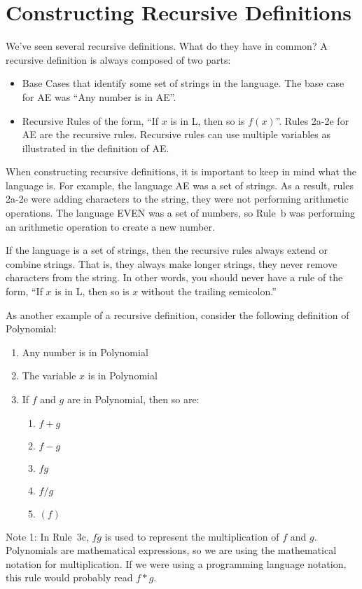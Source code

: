 \documentclass[letterpaper,12pt,openany,reqno]{book}%
\begin{document}
\section{Constructing Recursive Definitions}
We've seen several recursive definitions. What do they have in common? A recursive definition is always composed of two parts:
\begin{itemize}
\item Base Cases that identify some set of strings in the language. The base case for AE was ``Any number is in AE''.
\item Recursive Rules of the form, ``If $x$ is in L, then so is $f(x)$''. Rules 2a-2e for AE are the recursive rules. Recursive rules can use multiple variables as illustrated in the definition of AE.
\end{itemize}

When constructing recursive definitions, it is important to keep in mind what the language is. For example, the language AE was a set of strings. As a result, rules 2a-2e were adding characters to the string, they were not performing arithmetic operations. The language EVEN was a set of numbers, so Rule~b was performing an arithmetic operation to create a new number.

If the language is a set of strings, then the recursive rules always extend or combine strings. That is, they always make longer strings, they never remove characters from the string. In other words, you should never have a rule of the form, ``If $x$ is in L, then so is $x$ without the trailing semicolon.''

As another example of a recursive definition, consider the following definition of Polynomial:
\begin{enumerate}
\item Any number is in Polynomial
\item The variable $x$ is in Polynomial
\item If $f$ and $g$ are in Polynomial, then so are:
\begin{enumerate}
\item $f+g$
\item $f-g$
\item $f g$
\item $f/g$
\item $(f)$
\end{enumerate}
\end{enumerate}

Note 1: In Rule~3c, $f g$ is used to represent the multiplication of $f$ and $g$. Polynomials are mathematical expressions, so we are using the mathematical notation for multiplication. If we were using a programming language notation, this rule would probably read $f*g$.
\end{document}
